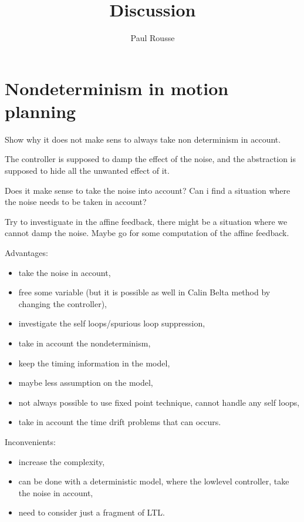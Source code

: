\documentclass{article}
\begin{document}
\title{Discussion}
\author{Paul Rousse}
\maketitle

\section{Nondeterminism in motion planning}
Show why it does not make sens to always take non determinism in account.

The controller is supposed to damp the effect of the noise, and the abstraction is supposed to hide all the unwanted effect of it.

Does it make sense to take the noise into account?
Can i find a situation where the noise needs to be taken in account?

Try to investiguate in the affine feedback, there might be a situation where we cannot damp the noise.
Maybe go for some computation of the affine feedback.


Advantages:
\begin{itemize}[noitemsep,topsep=0pt]
\item take the noise in account,
\item free some variable (but it is possible as well in Calin Belta method by changing the controller),
\item investigate the self loops/spurious loop suppression,
\item take in account the nondeterminism,
\item keep the timing information in the model,
\item maybe less assumption on the model,
\item not always possible to use fixed point technique, cannot handle any self loops, 
\item take in account the time drift problems that can occurs.
\end{itemize}

Inconvenients:
\begin{itemize}[noitemsep,topsep=0pt]
\item increase the complexity,
\item can be done with a deterministic model, where the lowlevel controller, take the noise in account,
\item need to consider just a fragment of LTL.
\end{itemize}
\end{document}
